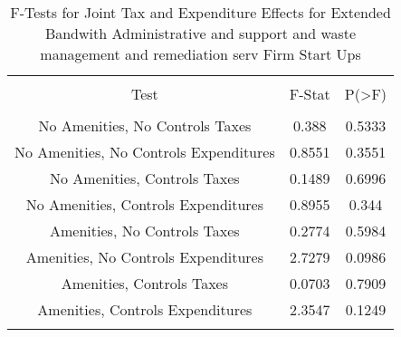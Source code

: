 
\begin{table}[!htbp] \centering 
  \caption{F-Tests for Joint Tax and Expenditure Effects for Extended Bandwith Administrative and support and waste management and remediation serv Firm Start Ups} 
  \label{56Ftests} 
\begin{tabular}{@{\extracolsep{5pt}} ccc} 
\\[-1.8ex]\hline 
\hline \\[-1.8ex] 
Test & F-Stat & P(\textgreater F) \\ 
\hline \\[-1.8ex] 
No Amenities, No Controls Taxes & 0.388 & 0.5333 \\ 
No Amenities, No Controls Expenditures & 0.8551 & 0.3551 \\ 
No Amenities, Controls Taxes & 0.1489 & 0.6996 \\ 
No Amenities, Controls Expenditures & 0.8955 & 0.344 \\ 
Amenities, No Controls Taxes & 0.2774 & 0.5984 \\ 
Amenities, No Controls Expenditures & 2.7279 & 0.0986 \\ 
Amenities, Controls Taxes & 0.0703 & 0.7909 \\ 
Amenities, Controls Expenditures & 2.3547 & 0.1249 \\ 
\hline \\[-1.8ex] 
\end{tabular} 
\end{table} 
